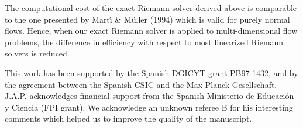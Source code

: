   The computational cost of the exact Riemann solver derived above is
comparable to the one presented by Mart\'{\i} \& M\"uller (1994) which
is valid for purely normal flows. Hence, when our exact Riemann solver
is applied to multi-dimensional flow problems, the difference in
efficiency with respect to most linearized Riemann solvers is reduced.


\acknowledgements 
This work has been supported by the Spanish DGICYT grant PB97-1432,
and by the agreement between the Spanish CSIC and the
Max-Planck-Gesellschaft. J.A.P. acknowledges financial support from
the Spanish Ministerio de Educaci\'on y Ciencia (FPI grant).
We acknowledge an unknown referee B for his interesting comments which
helped us to improve the quality of the manuscript.

